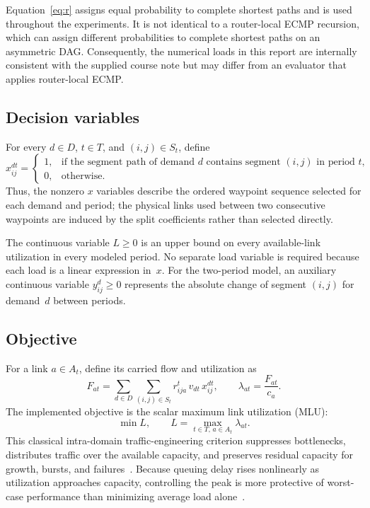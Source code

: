 Equation~\eqref{eq:r} assigns equal probability to complete shortest paths and is used throughout the
experiments. It is not identical to a router-local ECMP recursion, which can assign different
probabilities to complete shortest paths on an asymmetric DAG. Consequently, the numerical loads in
this report are internally consistent with the supplied course note but may differ from an evaluator
that applies router-local ECMP.

\subsection{Decision variables}

For every $d\in D$, $t\in T$, and $(i,j)\in S_t$, define
\[
x^{dt}_{ij}=
\begin{cases}
1, & \text{if the segment path of demand } d \text{ contains segment } (i,j) \text{ in period } t,\\
0, & \text{otherwise.}
\end{cases}
\]
Thus, the nonzero $x$ variables describe the ordered waypoint sequence selected for each demand and
period; the physical links used between two consecutive waypoints are induced by the split
coefficients rather than selected directly.

The continuous variable $L\ge 0$ is an upper bound on every available-link utilization in every
modeled period. No separate load variable is required because each load is a linear expression
in~$x$. For the two-period model, an auxiliary continuous variable $y^d_{ij}\ge 0$ represents the
absolute change of segment $(i,j)$ for demand~$d$ between periods.

\subsection{Objective}
\label{sec:objective}

For a link $a\in A_t$, define its carried flow and utilization as
\begin{equation}
F_{at}=\sum_{d\in D}\sum_{(i,j)\in S_t} r^t_{ija}\,v_{dt}\,x^{dt}_{ij},
\qquad
\lambda_{at}=\frac{F_{at}}{c_a}.
\label{eq:load-def}
\end{equation}
The implemented objective is the scalar maximum link utilization (MLU):
\begin{equation}
\min L,\qquad L=\max_{t\in T,\,a\in A_t}\lambda_{at}.
\label{eq:mlu}
\end{equation}
This classical intra-domain traffic-engineering criterion suppresses bottlenecks, distributes traffic
over the available capacity, and preserves residual capacity for growth, bursts, and
failures~\citep{fortz2002te,texcp2005}. Because queuing delay rises nonlinearly as utilization
approaches capacity, controlling the peak is more protective of worst-case performance than minimizing
average load alone~\citep{fortz2002te}.

